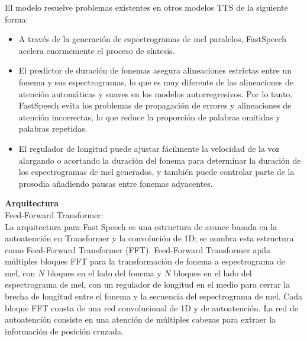 
El modelo resuelve problemas existentes en otros modelos TTS de la siguiente forma:

\begin{itemize}
	\item A través de la generación de espectrogramas de mel paralelos, FastSpeech acelera enormemente el proceso de síntesis.
	\item El predictor de duración de fonemas asegura alineaciones estrictas entre un fonema y sus espectrogramas, lo que es muy diferente de las alineaciones de atención automáticas y suaves en los modelos autorregresivos. Por lo tanto, FastSpeech evita los problemas de propagación de errores y alineaciones de atención incorrectas, lo que reduce la proporción de palabras omitidas y palabras repetidas.
	\item El regulador de longitud puede ajustar fácilmente la velocidad de la voz alargando o acortando la duración del fonema para determinar la duración de los espectrogramas de mel generados, y también puede controlar parte de la prosodia añadiendo pausas entre fonemas adyacentes.
\end{itemize}


\textbf{Arquitectura}\\

Feed-Forward Transformer: \\
La arquitectura para Fast Speech es una estructura de avance basada en la autoatención en Transformer y la convolución de 1D; se nombra esta estructura como Feed-Forward Transformer (FFT). Feed-Forward Transformer apila múltiples bloques FFT para la transformación de fonema a espectrograma de mel, con $N$ bloques en el lado del fonema y $N$ bloques en el lado del espectrograma de mel, con un regulador de longitud en el medio para cerrar la brecha de longitud entre el fonema y la secuencia del espectrograma de mel. Cada bloque FFT consta de una red convolucional de 1D y de autoatención. La red de autoatención consiste en una atención de múltiples cabezas para extraer la información de posición cruzada. \\ %

